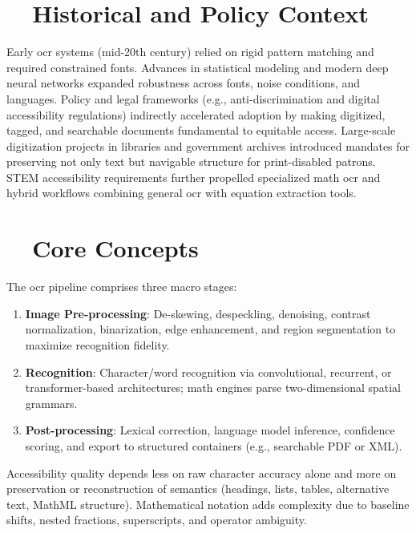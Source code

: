\section{~~Historical and Policy Context}
\label{sec:ocr-history}
Early \gls{ocr} systems (mid-20th century) relied on rigid pattern matching and required constrained fonts. Advances in statistical modeling and modern deep neural networks expanded robustness across fonts, noise conditions, and languages. Policy and legal frameworks (e.g., anti-discrimination and digital accessibility regulations) indirectly accelerated adoption by making digitized, tagged, and searchable documents fundamental to equitable access. Large-scale digitization projects in libraries and government archives introduced mandates for preserving not only text but navigable structure for print-disabled patrons. STEM accessibility requirements further propelled specialized math \gls{ocr} and hybrid workflows combining general \gls{ocr} with equation extraction tools.

\section{~~Core Concepts}
\label{sec:ocr-core-concepts}
The \gls{ocr} pipeline comprises three macro stages:
\begin{enumerate}
	\item \textbf{Image Pre-processing}: De-skewing, despeckling, denoising, contrast normalization, binarization, edge enhancement, and region segmentation to maximize recognition fidelity.
	\item \textbf{Recognition}: Character/word recognition via convolutional, recurrent, or transformer-based architectures; math engines parse two-dimensional spatial grammars.
	\item \textbf{Post-processing}: Lexical correction, language model inference, confidence scoring, and export to structured containers (e.g., searchable PDF or XML).
\end{enumerate}
Accessibility quality depends less on raw character accuracy alone and more on preservation or reconstruction of semantics (headings, lists, tables, alternative text, MathML structure). Mathematical notation adds complexity due to baseline shifts, nested fractions, superscripts, and operator ambiguity.

